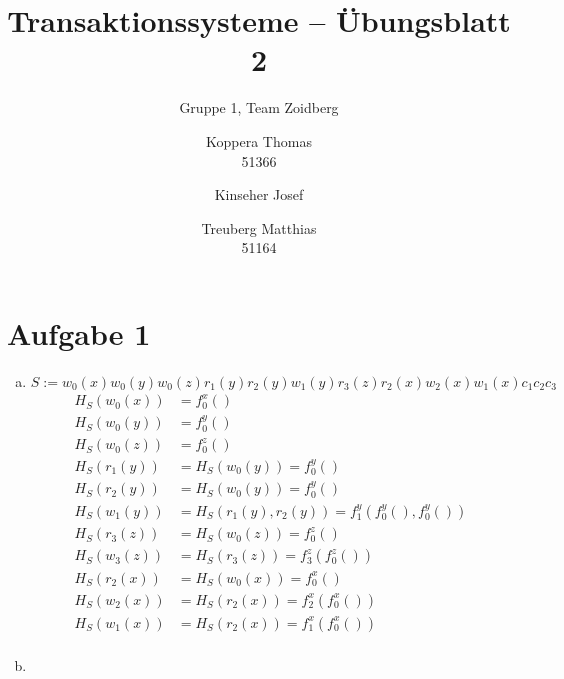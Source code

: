 \documentclass{scrartcl}
\title{Transaktionssysteme -- Übungsblatt 2}
\subtitle{Gruppe 1, Team Zoidberg}
\author{Koppera Thomas \\ 51366
 \and Kinseher Josef \\ 
 \and Treuberg Matthias \\ 51164}
\date{ }
\begin{document}
  \maketitle
  
\section*{Aufgabe 1}
\begin{enumerate}[a)]
\item
$S := w_0(x)w_0(y)w_0(z)r_1(y)r_2(y)w_1(y)r_3(z)r_2(x)w_2(x)w_1(x)c_1 c_2 c_3$
\begin{align*}
H_S(w_0(x)) &= f_0^x()\\
H_S(w_0(y)) &= f_0^y()\\
H_S(w_0(z)) &= f_0^z()\\
H_S(r_1(y)) &= H_S(w_0(y)) = f_0^y()\\
H_S(r_2(y)) &= H_S(w_0(y)) = f_0^y()\\
H_S(w_1(y)) &= H_S(r_1(y),r_2(y)) = f_1^y(f_0^y(),f_0^y())\\
H_S(r_3(z)) &= H_S(w_0(z)) = f_0^z()\\
H_S(w_3(z)) &= H_S(r_3(z)) = f_3^z(f_0^z())\\
H_S(r_2(x)) &= H_S(w_0(x)) = f_0^x()\\
H_S(w_2(x)) &= H_S(r_2(x)) = f_2^x(f_0^x())\\
H_S(w_1(x)) &= H_S(r_2(x)) = f_1^x(f_0^x())\\
\end{align*}
\item
\end{enumerate}
\end{document}

